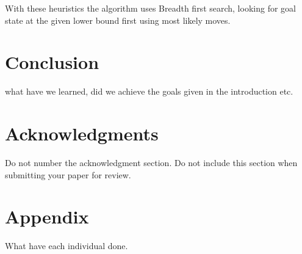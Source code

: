 \documentclass[11pt]{article}
\begin{document}
With these heuristics the algorithm uses Breadth first search, looking for goal state at the given lower bound first using most likely moves.

\section*{Conclusion}
 what have we learned, did we achieve the goals given in the introduction etc.

\section*{Acknowledgments}

Do not number the acknowledgment section. Do not include this section
when submitting your paper for review.




\section*{Appendix}
What have each individual done.






\end{document}

